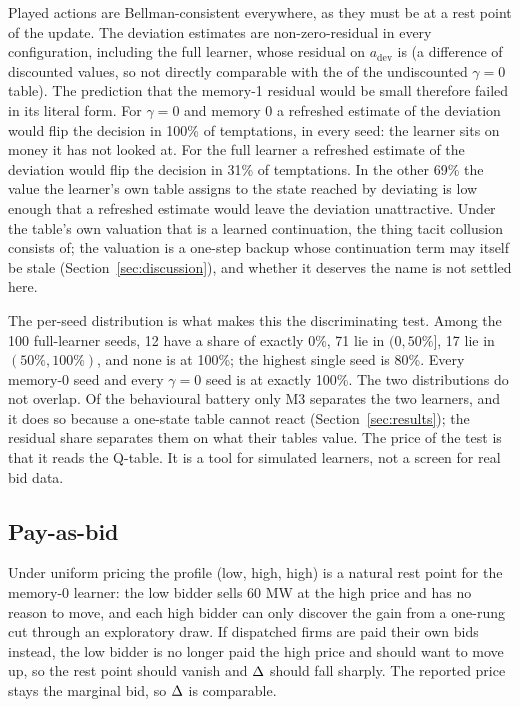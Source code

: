 Played actions are Bellman-consistent everywhere, as they must be at a rest point of the update. The deviation estimates are non-zero-residual in every configuration, including the full learner, whose residual on $a_{\mathrm{dev}}$ is  (a difference of discounted values, so not directly comparable with the  of the undiscounted $\gamma = 0$ table). The prediction that the memory-1 residual would be small therefore failed in its literal form. For $\gamma = 0$ and memory 0 a refreshed estimate of the deviation would flip the decision in 100\% of temptations, in every seed: the learner sits on money it has not looked at. For the full learner a refreshed estimate of the deviation would flip the decision in 31\% of temptations. In the other 69\% the value the learner's own table assigns to the state reached by deviating is low enough that a refreshed estimate would leave the deviation unattractive. Under the table's own valuation that is a learned continuation, the thing tacit collusion consists of; the valuation is a one-step backup whose continuation term may itself be stale (Section~\ref{sec:discussion}), and whether it deserves the name is not settled here.

The per-seed distribution is what makes this the discriminating test. Among the 100 full-learner seeds, 12 have a share of exactly 0\%, 71 lie in $(0, 50\%]$, 17 lie in $(50\%, 100\%)$, and none is at 100\%; the highest single seed is 80\%. Every memory-0 seed and every $\gamma = 0$ seed is at exactly 100\%. The two distributions do not overlap. Of the behavioural battery only M3 separates the two learners, and it does so because a one-state table cannot react (Section~\ref{sec:results}); the residual share separates them on what their tables value. The price of the test is that it reads the Q-table. It is a tool for simulated learners, not a screen for real bid data.

\subsection{Pay-as-bid}\label{sec:payasbid}

Under uniform pricing the profile (low, high, high) is a natural rest point for the memory-0 learner: the low bidder sells 60 MW at the high price and has no reason to move, and each high bidder can only discover the gain from a one-rung cut through an exploratory draw. If dispatched firms are paid their own bids instead, the low bidder is no longer paid the high price and should want to move up, so the rest point should vanish and $\Delta$ should fall sharply. The reported price stays the marginal bid, so $\Delta$ is comparable.

